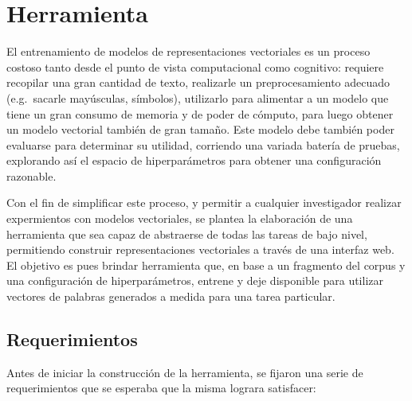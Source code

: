 \chapter{Herramienta}

El entrenamiento de modelos de representaciones vectoriales es un proceso costoso tanto desde el
punto de vista computacional como cognitivo: requiere recopilar una gran cantidad de texto,
realizarle un preprocesamiento adecuado (e.g.\ sacarle mayúsculas, símbolos), utilizarlo para
alimentar a un modelo que tiene un gran consumo de memoria y de poder de cómputo, para luego obtener
un modelo vectorial también de gran tamaño. Este modelo debe también poder evaluarse para determinar
su utilidad, corriendo una variada batería de pruebas, explorando así el espacio de hiperparámetros
para obtener una configuración razonable.

Con el fin de simplificar este proceso, y permitir a cualquier investigador realizar expermientos
con modelos vectoriales, se plantea la elaboración de una herramienta que sea capaz de abstraerse de
todas las tareas de bajo nivel, permitiendo construir representaciones vectoriales a través de una
interfaz web. El objetivo es pues brindar herramienta que, en base a un fragmento del corpus y una
configuración de hiperparámetros, entrene y deje disponible para utilizar vectores de palabras
generados a medida para una tarea particular.


\section{Requerimientos}

Antes de iniciar la construcción de la herramienta, se fijaron una serie de requerimientos que se
esperaba que la misma lograra satisfacer:


